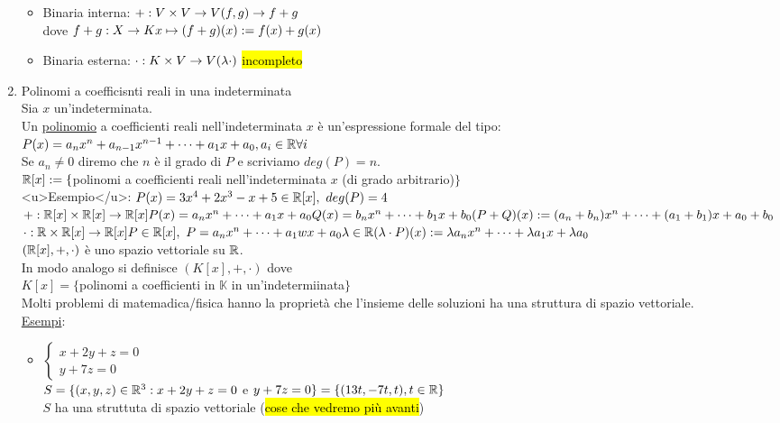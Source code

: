 \documentclass{article}
\begin{document}
\begin{enumerate}
\begin{itemize}
		      \item Binaria interna: $+:V\times V\to V\\(f,g)\to f+g$\\
		            dove $f+g: X\to K\\x\mapsto(f+g)(x):=f(x)+g(x)$
		      \item Binaria esterna: $\cdot:K\times V\to V\\(\lambda\cdot)$ \hl{incompleto}
	      \end{itemize}
	\item Polinomi a coefficisnti reali in una indeterminata\\
	      Sia $x$ un'indeterminata.\\
	      Un \ul{polinomio} a coefficienti reali nell'indeterminata $x$ è un'espressione formale del tipo:\\
	      $P(x)=a_nx^n+a_{n-1}x^{n-1}+\cdots+a_1x+a_0,a_i\in\mathbb{R}\forall i$\\
	      Se $a_n\ne0$ diremo che $n$ è il grado di $P$ e scriviamo $deg(P)=n$.\\
	      $\mathbb{R}[x]:=\{$polinomi a coefficienti reali nell'indeterminata $x$ (di grado arbitrario)$\}$\\
	      <u>Esempio</u>: $P(x)=3x^4+2x^3-x+5\in\mathbb{R}[x],\ deg(P)=4$\\
	      $+:\mathbb{R}[x]\times\mathbb{R}[x]\to\mathbb{R}[x]\\P(x)=a_nx^n+\cdots+a_1x+a_0\\Q(x)=b_nx^n+\cdots+b_1x+b_0\\(P+Q)(x):=(a_n+b_n)x^n+\cdots+(a_1+b_1)x+a_0+b_0$\\
	      $\cdot:\R\times\R[x]\to\R[x]\\P\in\R[x],\ P=a_nx^n+\cdots+a_1wx+a_0\\\lambda\in\R\\(\lambda\cdot P)(x):=\lambda a_nx^n+\cdots+\lambda a_1x+\lambda a_0$\\
	      $(\mathbb{R}[x],+,\cdot)$ è uno spazio vettoriale su $\mathbb{R}$.\\
	      In modo analogo si definisce $(K[x],+,\cdot)$ dove\\
	      $K[x]=\{$polinomi a coefficienti in $\mathbb{K}$ in un'indetermiinata$\}$\\
	      Molti problemi di matemadica/fisica hanno la proprietà che l'insieme delle soluzioni ha una struttura di spazio vettoriale.\\
	      \ul{Esempi}:
	      \begin{itemize}
		      \item $\begin{cases}x+2y+z=0\\y+7z=0\end{cases}$\\
		            $S=\{(x,y,z)\in\mathbb{R}^3:x+2y+z=0$ e $y+7z=0\}=\{(13t,-7t,t),t\in\mathbb{R}\}$\\
		            $S$ ha una struttuta di spazio vettoriale (\hl{cose che vedremo più avanti})
	      \end{itemize}
\end{enumerate}
\end{document}
